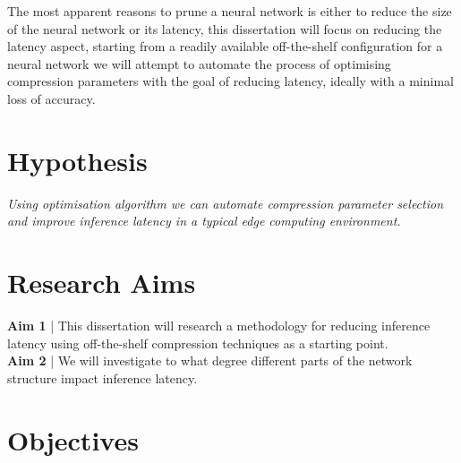 \documentclass[../Dissertation.tex]{subfiles}
\begin{document}
The most apparent reasons to prune a neural network is either to reduce the size of the neural network or its latency, this dissertation will focus on reducing the latency aspect, starting from a readily available off-the-shelf configuration for a neural network we will attempt to automate the process of optimising compression parameters with the goal of reducing latency, ideally with a minimal loss of accuracy.

\section{Hypothesis}
\emph{Using optimisation algorithm we can automate compression parameter selection and improve inference latency in a typical edge computing environment.}

\section{Research Aims}

\textbf{Aim 1}\label{Aim1} | This dissertation will research a methodology for reducing inference latency using off-the-shelf compression techniques as a starting point.\\
\noindent\textbf{Aim 2}\label{Aim2} | We will investigate to what degree different parts of the network structure impact inference latency. 

\section{Objectives}
\end{document}

